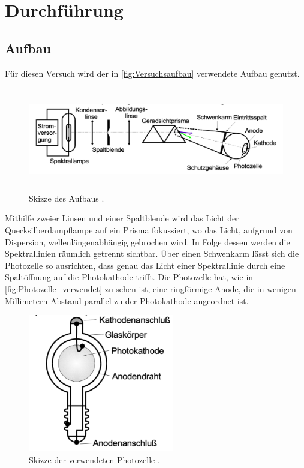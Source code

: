 \section{Durchführung}
\label{sec:Durchführung}
\subsection{Aufbau}
Für diesen Versuch wird der in \autoref{fig:Versuchsaufbau} verwendete Aufbau genutzt.
\begin{figure}
    \centering
    \includegraphics[height=4.5cm]{content/pics/Aufbau.pdf}
    \caption{Skizze des Aufbaus \cite{v500}.}
    \label{fig:Versuchsaufbau}
\end{figure}
Mithilfe zweier Linsen und einer Spaltblende wird das Licht der Quecksilberdampflampe auf ein Prisma fokussiert,
wo das Licht, aufgrund von Dispersion, wellenlängenabhängig gebrochen wird. In Folge dessen werden die 
Spektrallinien räumlich getrennt sichtbar.
Über einen Schwenkarm lässt sich die Photozelle so ausrichten, dass genau das Licht einer Spektrallinie durch
eine Spaltöffnung auf die Photokathode trifft.
Die Photozelle hat, wie in \autoref{fig:Photozelle_verwendet} zu sehen ist, eine ringförmige Anode, die 
in wenigen Millimetern Abstand parallel zu der Photokathode angeordnet ist.

\begin{figure}
    \centering
    \includegraphics[height=6cm]{content/pics/Photozelle_verwendet.pdf}
    \caption{Skizze der verwendeten Photozelle \cite{v500}.}
    \label{fig:Photozelle_verwendet}
\end{figure}

